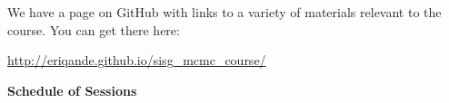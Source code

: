 We have a page on GitHub with links to a variety of materials relevant to the course.
You can get there here:

\url{http://eriqande.github.io/sisg_mcmc_course/}

\es\bs
\begin{center}
{\color{section0}\bf\Large Schedule of Sessions}
\vspace*{.25in}
\enlargethispage*{1000pt}

%

%

\end{center}


